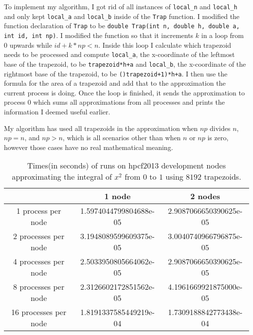 \documentclass[11pt]{article}
\begin{document}
To implement my algorithm, I got rid of all instances of \texttt{local\_n} and \texttt{local\_h} and only kept \texttt{local\_a} and \texttt{local\_b} inside of the \texttt{Trap} function. I modified the function declaration of \texttt{Trap} to be \texttt{double Trap(int n, double h, double a, int id, int np)}. I modified the function so that it increments $k$ in a loop from $0$ upwards while $id+k*np < n$. Inside this loop I calculate which trapezoid needs to be processed and compute \texttt{local\_a}, the x-coordinate of the leftmost base of the trapezoid, to be \texttt{trapezoid*h+a} and \texttt{local\_b}, the x-coordinate of the rightmost base of the trapezoid, to be \texttt{()trapezoid+1)*h+a}. I then use the formula for the area of a trapezoid and add that to the approximation the current process is doing. Once the loop is finished, it sends the approximation to process $0$ which sums all approximations from all processes and prints the information I deemed useful earlier.

My algorithm has used all trapezoids in the approximation when $np$ divides $n$, $np=n$, and $np > n$, which is all scenarios other than when $n$ or $np$ is zero, however those cases have no real mathematical meaning.

\begin{table}
\centering
\begin{tabular}{|c|c|c|}
\hline
	& 1 node & 2 nodes  \\ [0.5ex] 
 \hline
 1 process per node & 1.5974044799804688e-05 & 2.9087066650390625e-05   \\ 
 \hline
 2 processes per node & 3.1948089599609375e-05 & 3.0040740966796875e-05   \\
 \hline
4 processes per node & 2.5033950805664062e-05 & 2.9087066650390625e-05   \\
 \hline
8 processes per node & 2.3126602172851562e-05 & 4.1961669921875000e-05   \\
 \hline
16 processes per node &  1.8191337585449219e-04 & 1.7309188842773438e-04   \\ [1ex] 
 \hline
\end{tabular}
\caption{Times(in seconds) of runs on hpcf2013 development nodes approximating the integral of $x^2$ from $0$ to $1$ using $8192$ trapezoids.}
\end{table}
\end{document}
